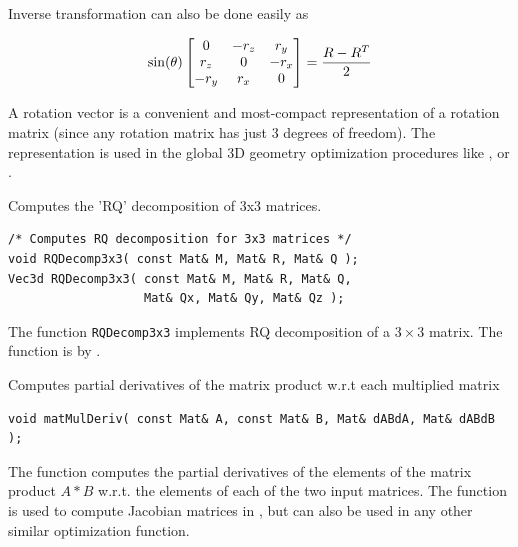 Inverse transformation can also be done easily as

\[
\sin(\theta)
\begin{bmatrix} 0 & -r_z & r_y\\ r_z & 0 & -r_x\\ -r_y & r_x & 0 \end{bmatrix}
=
\frac{R - R^T}{2}
\]

A rotation vector is a convenient and most-compact representation of a rotation matrix
(since any rotation matrix has just 3 degrees of freedom). The representation is
used in the global 3D geometry optimization procedures like ,  or .


\label{RQDecomp3x3}
Computes the 'RQ' decomposition of 3x3 matrices.

\begin{lstlisting}
/* Computes RQ decomposition for 3x3 matrices */
void RQDecomp3x3( const Mat& M, Mat& R, Mat& Q );
Vec3d RQDecomp3x3( const Mat& M, Mat& R, Mat& Q,
                   Mat& Qx, Mat& Qy, Mat& Qz );
\end{lstlisting}
\begin{description}
\end{description}

The function \texttt{RQDecomp3x3} implements RQ decomposition of a $3 \times 3$ matrix. The function is by .

\label{matMulDeriv}
Computes partial derivatives of the matrix product w.r.t each multiplied matrix

\begin{lstlisting}
void matMulDeriv( const Mat& A, const Mat& B, Mat& dABdA, Mat& dABdB );
\end{lstlisting}
\begin{description}
\end{description}

The function computes the partial derivatives of the elements of the matrix product $A*B$ w.r.t. the elements of each of the two input matrices. The function is used to compute Jacobian matrices in , but can also be used in any other similar optimization function.


